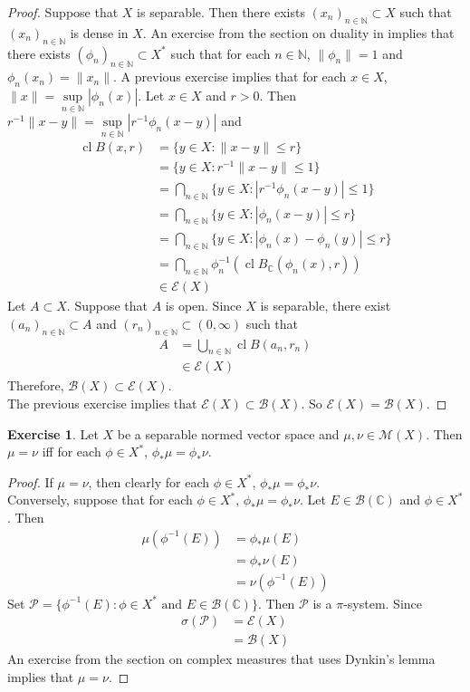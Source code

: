 \documentclass{book}
\theoremstyle{definition}
\newtheorem{ex}[definition]{Exercise}
\newcommand{\sig}{\sigma}
\newcommand{\C}{\mathbb{C}}
\newcommand{\N}{\mathbb{N}}
\newcommand{\MB}{\mathcal{B}}
\newcommand{\ME}{\mathcal{E}}
\newcommand{\MM}{\mathcal{M}}
\newcommand{\MP}{\mathcal{P}}
\DeclareMathOperator{\cl}{cl}
\DeclareMathOperator*{\0}{\mbf{0}}
\DeclareMathOperator*{\1}{\mbf{1}}
\begin{document}
	\begin{proof}
		Suppose that $X$ is separable. Then there exists $(x_n)_{n \in \N} \subset X$ such that $(x_n)_{n \in \N}$ is dense in $X$. An exercise from the section on duality in \cite{analysis} implies that there exists $(\phi_n)_{n \in \N} \subset X^*$ such that for each $n \in \N$, $\|\phi_n\| = 1$ and $\phi_n(x_n) = \|x_n\|$. A previous exercise implies that for each $x \in X$, $\|x\| = \sup\limits_{n \in \N} |\phi_n(x)|$. Let $x \in X$ and $r > 0$. Then $r^{-1}\|x - y \| = \sup\limits_{n \in \N} |r^{-1}\phi_n(x - y)|$ and 
		\begin{align*}
			\cl B(x,r)
			& = \{y \in X: \|x -y \| \leq r\} \\
			& = \{y \in X: r^{-1}\|x - y \| \leq 1\} \\
			& = \bigcap_{n \in \N} \{y \in X: |r^{-1}\phi_n(x - y)| \leq 1\} \\
			& = \bigcap_{n \in \N} \{y \in X: |\phi_n(x - y)| \leq r\} \\ 
			& = \bigcap_{n \in \N} \{y \in X: |\phi_n(x) - \phi_n(y)| \leq r\} \\
			& = \bigcap_{n \in \N} \phi_n^{-1}(\cl B_{\C}(\phi_n (x), r)) \\
			& \in \ME(X)
		\end{align*}
		Let $A \subset X$. Suppose that $A$ is open. Since $X$ is separable, there exist $(a_n)_{n \in \N} \subset A$ and $(r_n)_{n \in \N} \subset (0, \infty)$ such that 
		\begin{align*}
			A 
			& = \bigcup_{n \in \N} \cl B(a_n, r_n) \\
			& \in \ME(X)
		\end{align*}
		Therefore, $\MB(X) \subset \ME(X)$. \\
		The previous exercise implies that $\ME(X) \subset \MB(X)$. So $\ME(X) = \MB(X)$.
	\end{proof}
	
	\begin{ex}
		Let $X$ be a separable normed vector space and $\mu, \nu \in \MM(X)$. Then $\mu = \nu$ iff for each $\phi \in X^*$, $\phi_*\mu = \phi_*\nu$.
	\end{ex}
	
	\begin{proof}
		If $\mu = \nu$, then clearly for each $\phi \in X^*$, $\phi_*\mu = \phi_*\nu$. \\
		Conversely, suppose that for each $\phi \in X^*$, $\phi_*\mu = \phi_*\nu$. Let $E \in \MB(\C)$ and $\phi \in X^*$. Then 
		\begin{align*}
			\mu(\phi^{-1}(E)) 
			& = \phi_*\mu(E) \\
			& = \phi_*\nu(E) \\
			&= \nu(\phi^{-1}(E))
		\end{align*}
		Set $\MP = \{\phi^{-1}(E): \phi \in X^* \text{ and } E \in \MB(\C)\}$. Then $\MP$ is a $\pi$-system. Since 
		\begin{align*}
			\sig(\MP) 
			& = \ME(X) \\
			& = \MB(X)
		\end{align*}
		An exercise from the section on complex measures that uses Dynkin's lemma implies that $\mu = \nu$.
	\end{proof}
	
\end{document}
